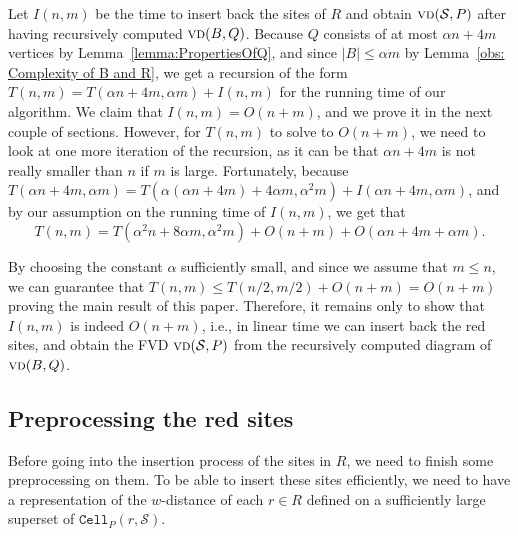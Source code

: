 \documentclass[a4paper, 11pt]{article}
\newcommand{\s}{\mathcal S}
\newcommand{\cell}[2][P]{\ensuremath{\mathtt{Cell}_{\scriptscriptstyle #1}(#2)}}
\newcommand{\vd}[2][P]{\textsc{vd}(#2, #1)}
\newcommand{\bvd}[2][P]{\textsc{vd}_{\partial}(#2, #1)}
\newcommand{\LL}[1][\s, P]{\ensuremath{\mathcal L_{_{#1}}}}
\newcommand{\A}{\ensuremath{\mathcal A}}
\begin{document}
Let $I(n,m)$ be the time to insert back the sites of $R$ and obtain $\vd{\s}$ after having recursively computed $\vd[Q]{B}$.
Because $Q$ consists of at most $\alpha n + 4m$ vertices by Lemma~\ref{lemma:PropertiesOfQ}, and since $|B|\leq \alpha m$ by Lemma~\ref{obs: Complexity of B and R}, we get a recursion of the form $T(n, m) = T(\alpha n + 4m, \alpha m) + I(n,m)$ for the running time of our algorithm. 
We claim that $I(n,m) = O(n+m)$, and we prove it in the next couple of sections.
However, for $T(n,m)$ to solve to $O(n+ m)$, we need to look at one more iteration of the recursion, as it can be that $\alpha n + 4m$ is not really smaller than $n$ if $m$ is large. 
Fortunately, because $T(\alpha n + 4m, \alpha m) = T(\alpha(\alpha n + 4m) + 4\alpha m, \alpha^2 m) + I(\alpha n + 4m, \alpha m)$, and by our assumption on the running time of $I(n,m)$, we get that
\[T(n,m) = T(\alpha^2 n + 8\alpha m, \alpha^2 m) + O(n+m) + O(\alpha n + 4m + \alpha m).\]

By choosing the constant $\alpha$ sufficiently small, and since we assume that $m\leq n$, we can guarantee that $T(n, m) \leq T(n/2, m/2) + O(n + m) = O(n +m)$ proving the main result of this paper.
Therefore, it remains only to show that $I(n,m)$ is indeed $O(n+ m)$, i.e., in linear time we can insert back the red sites, and obtain the FVD $\vd{\s}$ from the recursively computed diagram of $\vd[Q]{B}$.


\subsection{Preprocessing the red sites}\label{sec: Preprocessing of red sites}
Before going into the insertion process of the sites in $R$, we need to finish some preprocessing on them.
To be able to insert these sites efficiently, we need to have a representation of the $w$-distance of each $r\in R$ defined on a sufficiently large superset of $\cell{r, \s}$. 
\end{document}
